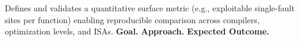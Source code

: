 \subsubsection{\researchonetwo}
Defines and validates a quantitative surface metric (e.g., exploitable single-fault sites per function) enabling reproducible comparison across compilers, optimization levels, and ISAs.
\noindent\textbf{Goal.} %
\noindent\textbf{Approach.} %
\noindent\textbf{Expected Outcome.} %
